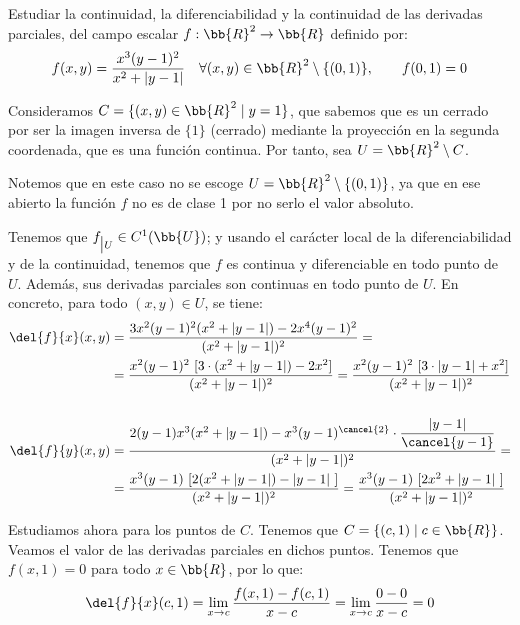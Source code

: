 \begin{ejercicio}
    Estudiar la continuidad, la diferenciabilidad y la continuidad de las derivadas parciales, del campo escalar $f:\bb{R}^2\to \bb{R}$ definido por:
    \begin{equation*}
        f(x,y)=\frac{x^3(y-1)^2}{x^2+|y-1|} \quad
        \forall (x,y)\in \bb{R}^2\setminus \{(0,1)\},\qquad f(0,1)=0
    \end{equation*}

    Consideramos $C=\{(x,y)\in \bb{R}^2\mid y=1\}$, que sabemos que es un cerrado por ser la imagen inversa de $\{1\}$ (cerrado) mediante la proyección en la segunda coordenada, que es una función continua. Por tanto, sea $U=\bb{R}^2\setminus C$.
    \begin{observacion}
        Notemos que en este caso no se escoge $U=\bb{R}^2\setminus \{(0,1)\}$, ya que en ese abierto la función $f$ no es de clase 1 por no serlo el valor absoluto.
    \end{observacion}

    Tenemos que $f_{\big| U}\in C^1(\bb{U})$; y usando el carácter local de la diferenciabilidad y de la continuidad, tenemos que $f$ es continua y diferenciable en todo punto de $U$. Además, sus derivadas parciales son continuas en todo punto de $U$. En concreto, para todo $(x,y)\in U$, se tiene:
    \begin{equation*}\begin{split}
        \del{f}{x}(x,y)&=
        \frac{3x^2(y-1)^2(x^2+|y-1|)-2x^4(y-1)^2}{(x^2+|y-1|)^2}=\\
        &=
        \frac{x^2(y-1)^2~[3\cdot(x^2+|y-1|)-2x^2]}{(x^2+|y-1|)^2}
        = \frac{x^2(y-1)^2~[3\cdot|y-1|+x^2]}{(x^2+|y-1|)^2} \\ &\\
        \del{f}{y}(x,y)&=
        \frac{2(y-1)x^3(x^2+|y-1|)-x^3(y-1)^{\cancel{2}}\cdot \dfrac{|y-1|}{\cancel{y-1}}}{(x^2+|y-1|)^2} =\\
        &=
        \frac{x^3(y-1)~[2(x^2+|y-1|)-|y-1|~]}{(x^2+|y-1|)^2}
        =
        \frac{x^3(y-1)~[2x^2+|y-1|~]}{(x^2+|y-1|)^2}
    \end{split}\end{equation*}

    Estudiamos ahora para los puntos de $C$. Tenemos que $C=\{(c,1)\mid c\in \bb{R}\}$. Veamos el valor de las derivadas parciales en dichos puntos. Tenemos que $f(x,1)=0$ para todo $x\in \bb{R}$, por lo que:
    \begin{equation*}
        \del{f}{x}(c,1) = \lim_{x\to c}\frac{f(x,1) - f(c,1)}{x-c}
        =\lim_{x\to c}\frac{0 - 0}{x-c} = 0
    \end{equation*}


\end{ejercicio}

